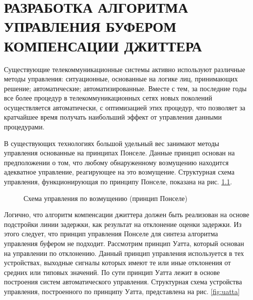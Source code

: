 \chapter{РАЗРАБОТКА АЛГОРИТМА УПРАВЛЕНИЯ БУФЕРОМ КОМПЕНСАЦИИ ДЖИТТЕРА} \label{chapt1}

Существующие телекоммуникационные системы активно используют различные методы управления: ситуационные, основанные на логике лиц, принимающих решение; автоматические; автоматизированные.
Вместе с тем, за последние годы все более процедур в телекоммуникационных сетях новых поколений осуществляется автоматически, с оптимизацией этих процедур, что позволяет за кратчайшее время получать наибольший эффект от управления данными процедурами.

В существующих технологиях большой удельный вес занимают методы управления основанные на принципах Понселе. Данные принцип основан на предположении о том, что любому обнаруженному возмущению находится адекватное управление, реагирующее на это возмущение.
Структурная схема управления, функционирующая по принципу Понселе, показана на рис. \ref{fig:ponsele}.


\begin{figure}[!h]

\centering
{} 
\caption{Схема управления по возмущению (принцип Понселе)}
\label{fig:ponsele}
\end{figure}

Логично, что алгоритм компенсации джиттера должен быть реализован на основе подстройки линии задержки, как результат на отклонение оценки задержки. 
Из этого следует, что принцип управления Понселе для синтеза алгоритма управления буфером не подходит. 
Рассмотрим принцип Уатта, который основан на управлении по отклонению.
Данный принцип управления используется в тех устройствах, выходные сигналы которых имеют те или иные отклонения от средних  или типовых значений.
По сути принцип Уатта лежит в основе построения систем автоматического управления. Структурная схема устройства управления, построенного по принципу Уатта, представлена на рис. \ref{fig:uatta}


